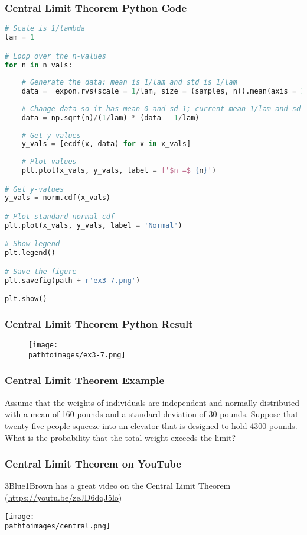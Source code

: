 \documentclass{beamer}
\newcommand{\pathtoimages}{/Users/charlesrambo/Desktop/Bootcamp24/Images}
\begin{document}
\begin{frame}[fragile]
\frametitle{Central Limit Theorem Python Code}
\begin{lstlisting}[language=Python]
# Scale is 1/lambda
lam = 1

# Loop over the n-values
for n in n_vals:
    
    # Generate the data; mean is 1/lam and std is 1/lam
    data =  expon.rvs(scale = 1/lam, size = (samples, n)).mean(axis = 1)
    
    # Change data so it has mean 0 and sd 1; current mean 1/lam and sd 1/(lam * sqrt(n))
    data = np.sqrt(n)/(1/lam) * (data - 1/lam)
    
    # Get y-values
    y_vals = [ecdf(x, data) for x in x_vals]
    
    # Plot values
    plt.plot(x_vals, y_vals, label = f'$n =$ {n}')

# Get y-values
y_vals = norm.cdf(x_vals)

# Plot standard normal cdf
plt.plot(x_vals, y_vals, label = 'Normal')

# Show legend
plt.legend()

# Save the figure
plt.savefig(path + r'ex3-7.png')

plt.show()\end{lstlisting}

\end{frame}

\begin{frame}
\frametitle{Central Limit Theorem Python Result}
\begin{figure}
\centering
\texttt{[image: \\pathtoimages/ex3-7.png]}
\end{figure}

\end{frame}

\begin{frame}[t]
\frametitle{Central Limit Theorem Example}
\tiny
\begin{Example}
Assume that the weights of individuals are independent and normally distributed with a mean of 160 pounds and a standard deviation of 30 pounds. Suppose that twenty-five people squeeze into an elevator that is designed to hold 4300 pounds. What is the probability that the total weight exceeds the limit?
\end{Example}
\end{frame}

\begin{frame}
\frametitle{Central Limit Theorem on YouTube}
\small
3Blue1Brown has a great video on the Central Limit Theorem (\url{https://youtu.be/zeJD6dqJ5lo})
\begin{center}
\texttt{[image: \\pathtoimages/central.png]}
\end{center}
\end{frame}
\end{document}
